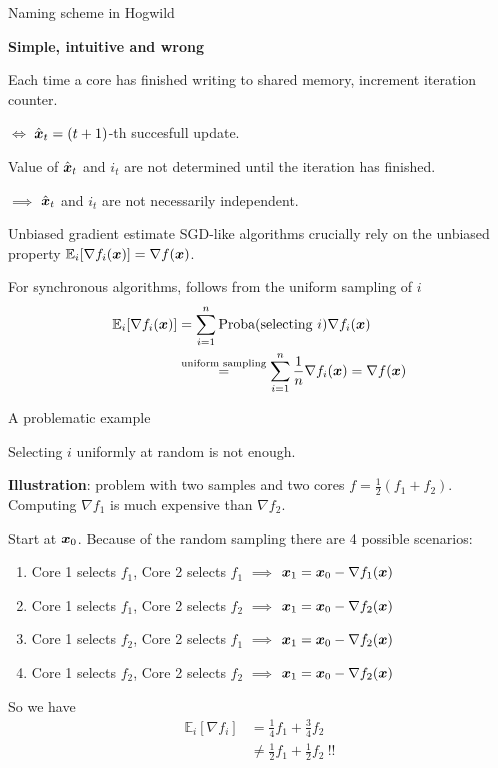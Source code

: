 \documentclass[10pt]{beamer}
\begin{document}
\begin{frame}{Naming scheme in Hogwild}

{\bfseries Simple, intuitive and wrong}

Each time a core has finished writing to shared memory, increment iteration counter.

$\iff$ $\hat{{\boldsymbol x}}_t = (t+1)$-th succesfull update.

Value of $\hat{{\boldsymbol x}}_t$ and $i_t$ are not determined until the iteration has finished.

$\implies$ $\hat{{\boldsymbol x}}_t$ and $i_t$  are not necessarily independent.

\end{frame}

\begin{frame}{Unbiased gradient estimate}
SGD-like algorithms crucially rely on the unbiased property $\mathbb{E}_i[\nabla f_i({\boldsymbol x})] = \nabla f({\boldsymbol x})$.

\vspace{1em}
For synchronous algorithms, follows from the uniform sampling of $i$ 
\begin{align*}
\mathbb{E}_i[\nabla f_i({\boldsymbol x})] &= \sum_{i=1}^n \text{Proba}(\text{selecting}~i) \nabla f_i({\boldsymbol x})\\
 &\stackrel{\text{uniform sampling}}{=} \sum_{i=1}^n \frac{1}{n} \nabla f_i({\boldsymbol x}) = \nabla f({\boldsymbol x})
\end{align*}
\end{frame}

\begin{frame}{A problematic example}

Selecting $i$ uniformly at random is not enough. 

\pause
{\bfseries Illustration}: problem with two samples and two cores $f = \frac{1}{2}(f_1 + f_2)$. Computing $\nabla f_1$ is much expensive than $\nabla f_2$.

\pause 
Start at ${\boldsymbol x}_0$. Because of the random sampling there are 4 possible scenarios:
\begin{enumerate}
\item Core 1 selects $f_1$, Core 2 selects $f_1$ $\implies$ ${\boldsymbol x}_1 = {\boldsymbol x}_0 - \nabla f_1({\boldsymbol x})$
\item Core 1 selects $f_1$, Core 2 selects $f_2$ $\implies$ ${\boldsymbol x}_1 = {\boldsymbol x}_0 - \nabla f_2({\boldsymbol x})$
\item Core 1 selects $f_2$, Core 2 selects $f_1$ $\implies$ ${\boldsymbol x}_1 = {\boldsymbol x}_0 - \nabla f_2({\boldsymbol x})$
\item Core 1 selects $f_2$, Core 2 selects $f_2$ $\implies$ ${\boldsymbol x}_1 = {\boldsymbol x}_0 - \nabla f_2({\boldsymbol x})$
\end{enumerate}
So we have
\begin{align*}
\mathbb{E}_i\left[\nabla f_i\right] &= \frac{1}{4}f_1 + \frac{3}{4} f_2 \\
&\neq \frac{1}{2}f_1 + \frac{1}{2} f_2 ~!!
\end{align*}
\end{frame}
\end{document}
